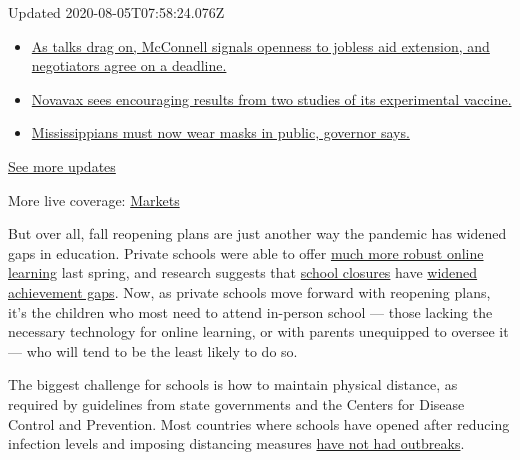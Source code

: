 Updated 2020-08-05T07:58:24.076Z

\begin{itemize}
\tightlist
\item
  \href{https://www.nytimes.com/2020/08/04/world/coronavirus-cases.html?action=click\&pgtype=Article\&state=default\&region=MAIN_CONTENT_1\&context=storylines_live_updates\#link-762df92}{As
  talks drag on, McConnell signals openness to jobless aid extension,
  and negotiators agree on a deadline.}
\item
  \href{https://www.nytimes.com/2020/08/04/world/coronavirus-cases.html?action=click\&pgtype=Article\&state=default\&region=MAIN_CONTENT_1\&context=storylines_live_updates\#link-1228a480}{Novavax
  sees encouraging results from two studies of its experimental
  vaccine.}
\item
  \href{https://www.nytimes.com/2020/08/04/world/coronavirus-cases.html?action=click\&pgtype=Article\&state=default\&region=MAIN_CONTENT_1\&context=storylines_live_updates\#link-794484ed}{Mississippians
  must now wear masks in public, governor says.}
\end{itemize}

\href{https://www.nytimes.com/2020/08/04/world/coronavirus-cases.html?action=click\&pgtype=Article\&state=default\&region=MAIN_CONTENT_1\&context=storylines_live_updates}{See
more updates}

More live coverage:
\href{https://www.nytimes.com/live/2020/08/04/business/stock-market-today-coronavirus?action=click\&pgtype=Article\&state=default\&region=MAIN_CONTENT_1\&context=storylines_live_updates}{Markets}

But over all, fall reopening plans are just another way the pandemic has
widened gaps in education. Private schools were able to offer
\href{https://www.nytimes.com/2020/05/09/us/coronavirus-public-private-school.html}{much
more robust online learning} last spring, and research suggests that
\href{https://www.nytimes.com/2020/07/29/health/covid-school-reopening.html}{school
closures} have
\href{https://www.nytimes.com/2020/06/05/us/coronavirus-education-lost-learning.html}{widened
achievement gaps}. Now, as private schools move forward with reopening
plans, it's the children who most need to attend in-person school ---
those lacking the necessary technology for online learning, or with
parents unequipped to oversee it --- who will tend to be the least
likely to do so.

The biggest challenge for schools is how to maintain physical distance,
as required by guidelines from state governments and the Centers for
Disease Control and Prevention. Most countries where schools have opened
after reducing infection levels and imposing distancing measures
\href{https://www.nytimes.com/2020/07/11/health/coronavirus-schools-reopen.html}{have
not had outbreaks}.

